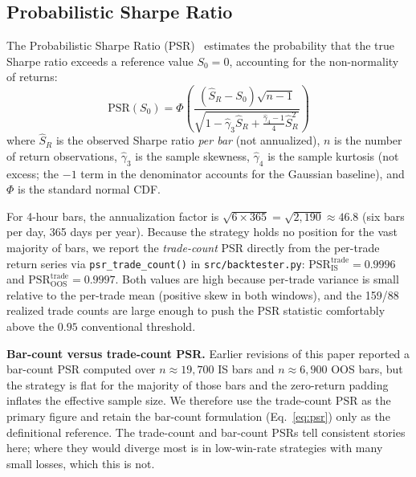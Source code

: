 \documentclass{article}
\begin{document}
\subsection{Probabilistic Sharpe Ratio}

The Probabilistic Sharpe Ratio (PSR)~\citep{Bailey2014DSR} estimates the probability that the true Sharpe ratio exceeds a reference value $S_0 = 0$, accounting for the non-normality of returns:
\begin{equation}
  \text{PSR}(S_0) = \Phi\!\left(\frac{(\hat{S}_R - S_0) \sqrt{n-1}}{\sqrt{1 - \hat{\gamma}_3 \hat{S}_R + \frac{\hat{\gamma}_4 - 1}{4} \hat{S}_R^2}}\right)
  \label{eq:psr}
\end{equation}
where $\hat{S}_R$ is the observed Sharpe ratio \emph{per bar} (not annualized), $n$ is the number of return observations, $\hat{\gamma}_3$ is the sample skewness, $\hat{\gamma}_4$ is the sample kurtosis (not excess; the $-1$ term in the denominator accounts for the Gaussian baseline), and $\Phi$ is the standard normal CDF.

For 4-hour bars, the annualization factor is $\sqrt{6 \times 365} = \sqrt{2{,}190} \approx 46.8$ (six bars per day, 365 days per year).
Because the strategy holds no position for the vast majority of bars, we report the \emph{trade-count} PSR directly from the per-trade return series via \texttt{psr\_trade\_count()} in \texttt{src/backtester.py}: $\text{PSR}^{\text{trade}}_{\text{IS}} = 0.9996$ and $\text{PSR}^{\text{trade}}_{\text{OOS}} = 0.9997$. Both values are high because per-trade variance is small relative to the per-trade mean (positive skew in both windows), and the 159/88 realized trade counts are large enough to push the PSR statistic comfortably above the $0.95$ conventional threshold.

\textbf{Bar-count versus trade-count PSR.}
Earlier revisions of this paper reported a bar-count PSR computed over $n \approx 19{,}700$ IS bars and $n \approx 6{,}900$ OOS bars, but the strategy is flat for the majority of those bars and the zero-return padding inflates the effective sample size. We therefore use the trade-count PSR as the primary figure and retain the bar-count formulation (Eq.~\eqref{eq:psr}) only as the definitional reference.
The trade-count and bar-count PSRs tell consistent stories here; where they would diverge most is in low-win-rate strategies with many small losses, which this is not.
\end{document}
